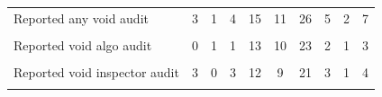 {\begin{tabular}{l*{9}{c}}
Reported any void audit&           3         &           1         &           4         &          15         &          11         &          26         &           5         &           2         &           7         \\
            &                     &                     &                     &                     &                     &                     &                     &                     &                     \\
Reported void algo audit&           0         &           1         &           1         &          13         &          10         &          23         &           2         &           1         &           3         \\
            &                     &                     &                     &                     &                     &                     &                     &                     &                     \\
Reported void inspector audit&           3         &           0         &           3         &          12         &           9         &          21         &           3         &           1         &           4         \\
            &                     &                     &                     &                     &                     &                     &                     &                     &                     \\
\bottomrule
\end{tabular}
}
